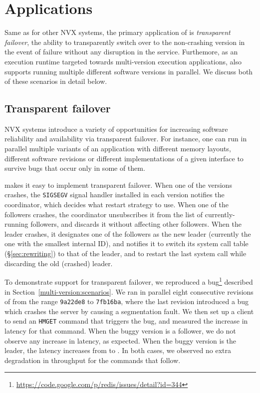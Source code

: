 \section{Applications}
\label{sec:applications}

Same as for other NVX systems, the primary application of \varan is
\emph{transparent failover}, \ie the ability to transparently switch over to
the non-crashing version in the event of failure without any disruption in the
service. Furthemore, as an execution runtime targeted towards multi-version
execution applications, \varan also supports running multiple different
software versions in parallel.  We discuss both of these scenarios in detail
below.

\subsection{Transparent failover}
\label{sec:failover}


NVX systems introduce a variety of opportunities for increasing
software reliability and availability via transparent failover.  For
instance, one can run in parallel multiple variants of an application with
different memory layouts, different software revisions or different
implementations of a given interface to survive bugs that occur 
only in some of them.   

\varan makes it easy to implement transparent failover.  When one of the
versions crashes, the \lstinline`SIGSEGV` signal handler installed in each
version notifies the coordinator, which decides what restart strategy
to use.  When one of the followers crashes, the coordinator unsubscribes it
from the list of currently-running followers, and discards it without
affecting other followers.  When the leader crashes, it designates one
of the followers as the new leader (currently the one with the
smallest internal ID), and notifies it to switch its system call table
(\S\ref{sec:rewriting}) to that of the leader, and to restart the last
system call while discarding the old (crashed) leader.

To demonstrate support for transparent failover, we reproduced a
\redis
bug\footnote{\url{https://code.google.com/p/redis/issues/detail?id=344}}
described in Section~\ref{multi-version:scenarios}.  We ran in
parallel eight consecutive revisions of \redis from the range
\lstinline`9a22de8` to \lstinline`7fb16ba`, where the last revision
introduced a bug which crashes the server by causing a segmentation
fault. We then set up a client to send an \lstinline`HMGET` command
that triggers the bug, and measured the increase in latency for that
command.  When the buggy version is a follower, we do not observe any
increase in latency, as expected.  When the buggy version is the leader,
the latency increases from \redisnormallatency to
\redisfailoverlatency.  In both cases, we observed no extra
degradation in throughput for the commands that follow.

